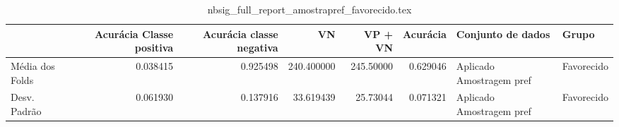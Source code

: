 \begin{table}
\centering
\caption{nbsig_full_report_amostrapref_favorecido.tex}
\label{nbsig_full_report_amostrapref_favorecido.tex}
\begin{tabular}{lrrrrrll}
\toprule
{} &  Acurácia Classe positiva &  Acurácia classe negativa &         VN  &   VP + VN  &  Acurácia &         Conjunto de dados &       Grupo \\
\midrule
Média dos Folds &                  0.038415 &                  0.925498 &  240.400000 &  245.50000 &  0.629046 &  Aplicado Amostragem pref &  Favorecido \\
Desv. Padrão    &                  0.061930 &                  0.137916 &   33.619439 &   25.73044 &  0.071321 &  Aplicado Amostragem pref &  Favorecido \\
\bottomrule
\end{tabular}
\end{table}
